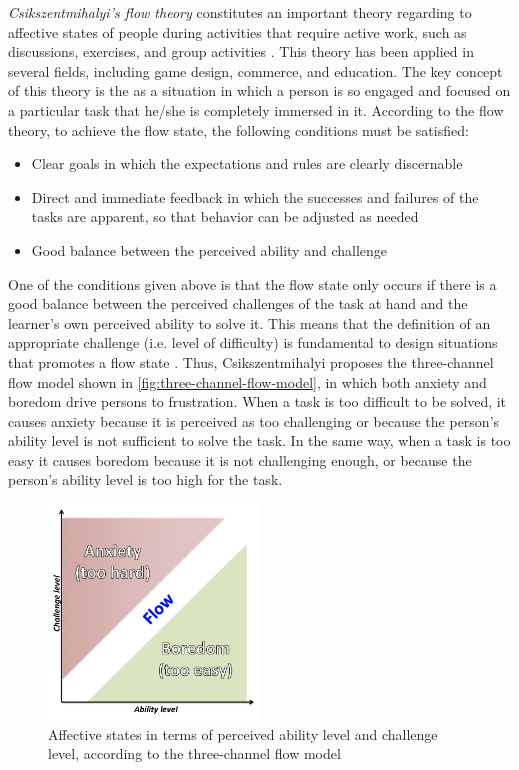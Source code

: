 \emph{Csikszentmihalyi’s flow theory} constitutes an important theory regarding to affective states of people during activities that require active work, such as discussions, exercises, and group activities \cite{Csikszentmihalyi2014,SnyderLopezPedrotti2010}. This theory has been applied in several fields, including game design, commerce, and education. The key concept of this theory is the  as a situation in which a person is so engaged and focused on a particular task that he/she is completely immersed in it. According to the flow theory, to achieve the flow state, the following conditions must be satisfied:

\begin{itemize}
\item Clear goals in which the expectations and rules are clearly discernable
\item Direct and immediate feedback in which the successes and failures of the tasks are apparent, so that behavior can be adjusted as needed
\item Good balance between the perceived ability and challenge
\end{itemize}

One of the conditions given above is that the flow state only occurs if there is a good balance between the perceived challenges of the task at hand and the learner’s own perceived ability to solve it. This means that the definition of an appropriate challenge (i.e. level of difficulty) is fundamental to design situations that promotes a flow state \cite{LinehanBellordKirmanMorfordRoche2014}. Thus, Csikszentmihalyi proposes the three-channel flow model \cite{Csikszentmihalyi2008} shown in \autoref{fig:three-channel-flow-model}, in which both anxiety and boredom drive persons to frustration. When a task is too difficult to be solved, it causes anxiety because it is perceived as too challenging or because the person’s ability level is not sufficient to solve the task. In the same way, when a task is too easy it causes boredom because it is not challenging enough, or because the person’s ability level is too high for the task.

 \begin{figure}[htb]
 \caption{Affective states in terms of perceived ability level and challenge level, according to the three-channel flow model}
 \label{fig:three-channel-flow-model}
 \centering
 \includegraphics[width=0.5\textwidth]{images/chap-model-gmif/three-channel-flow-model.png}
\end{figure}

